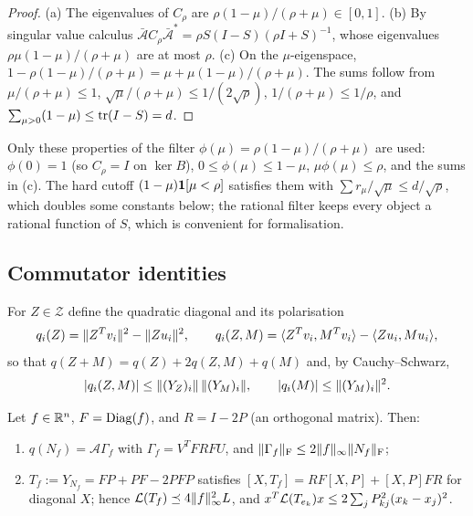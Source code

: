 \begin{proof}
(a) The eigenvalues of $C_\rho$ are $\rho(1-\mu)/(\rho+\mu)\in[0,1]$. (b) By
singular value calculus $\bar{\mathcal A}C_\rho\bar{\mathcal A}^*=\rho S(I-S)(\rho
I+S)^{-1}$, whose eigenvalues $\rho\mu(1-\mu)/(\rho+\mu)$ are at most $\rho$. (c)
On the $\mu$-eigenspace, $1-\rho(1-\mu)/(\rho+\mu)=\mu+\mu(1-\mu)/(\rho+\mu)$. The
sums follow from $\mu/(\rho+\mu)\le1$, $\sqrt\mu/(\rho+\mu)\le1/(2\sqrt\rho)$,
$1/(\rho+\mu)\le1/\rho$, and $\sum_{\mu>0}(1-\mu)\le\operatorname{tr}(I-S)=d$.
\end{proof}

\begin{remark}
Only these properties of the filter $\phi(\mu)=\rho(1-\mu)/(\rho+\mu)$ are used:
$\phi(0)=1$ (so $C_\rho=I$ on $\ker B$), $0\le\phi(\mu)\le1-\mu$,
$\mu\phi(\mu)\le\rho$, and the sums in (c). The hard cutoff $(1-\mu)\mathbf 1[\mu<\rho]$
satisfies them with $\sum r_\mu/\sqrt\mu\le d/\sqrt\rho$, which doubles some
constants below; the rational filter keeps every object a rational function of
$S$, which is convenient for formalisation.
\end{remark}

\subsection{Commutator identities}

For $Z\in\mathcal Z$ define the quadratic diagonal and its polarisation
\[
 q_i(Z)=\lVert Z^Tv_i\rVert^2-\lVert Zu_i\rVert^2,\qquad
 q_i(Z,M)=\langle Z^Tv_i,M^Tv_i\rangle-\langle Zu_i,Mu_i\rangle,
\]
so that $q(Z+M)=q(Z)+2q(Z,M)+q(M)$ and, by Cauchy--Schwarz,
\begin{equation}\label{eq:q-cs}
 |q_i(Z,M)|\le\lVert (Y_Z)_i\rVert\,\lVert (Y_M)_i\rVert,\qquad |q_i(M)|\le\lVert (Y_M)_i\rVert^2 .
\end{equation}

\begin{lemma}\label{lem:commutator}
Let $f\in\mathbb R^n$, $F=\operatorname{Diag}(f)$, and $R=I-2P$ (an orthogonal matrix). Then:
\begin{enumerate}[label=(\alph*)]
\item $q(N_f)=\mathcal A\Gamma_f$ with $\Gamma_f=V^TFRFU$, and
$\lVert \Gamma_f\rVert_{\mathrm F}\le2\lVert f\rVert_\infty\lVert N_f\rVert_{\mathrm F}$;
\item $T_f:=Y_{N_f}=FP+PF-2PFP$ satisfies
$[X,T_f]=RF[X,P]+[X,P]FR$ for diagonal $X$; hence
$\mathcal L(T_f)\preceq4\lVert f\rVert_\infty^2L$, and
$x^T\mathcal L(T_{e_k})x\le2\sum_jP_{kj}^2(x_k-x_j)^2$.
\end{enumerate}
\end{lemma}

